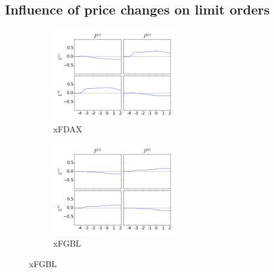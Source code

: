 \documentclass[a4paper,11pt]{article}
\begin{document}
\subsection{Influence of price changes on limit orders}
\label{PL}
\begin{figure}[H]
        \begin{subfigure}[b]{0.45\textwidth}
                \includegraphics[width=\textwidth,height=40mm]{xFDAXPA_PB_TA_TB_LA_LB_CA_CB__PAPB-_LALBcausality.png}
                \caption{xFDAX}
        \end{subfigure}
        \begin{subfigure}[b]{0.45\textwidth}
                \includegraphics[width=\textwidth,height=40mm]{xFGBLPA_PB_TA_TB_LA_LB_CA_CB__PAPB-_LALBcausality.png}
                \caption{xFGBL}
        \end{subfigure}
\end{figure}
\end{document}
